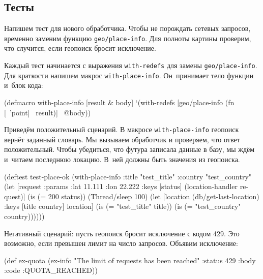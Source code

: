 \subsection{Тесты}


Напишем тест для нового обработчика. Чтобы не порождать сетевых запросов,
временно заменим функцию \verb|geo/place-info|. Для полноты картины проверим,
что случится, если геопоиск бросит исключение.

Каждый тест начинается с выражения \verb|with-redefs| для замены
\verb|geo/place-info|. Для краткости напишем макрос
\verb|with-place-info|. Он~принимает тело функции и~блок кода:

\begin{english}
  \begin{clojure}
(defmacro with-place-info
  [result & body]
  `(with-redefs [geo/place-info
                 (fn [~'point] ~result)]
     ~@body))
  \end{clojure}
\end{english}

Приведём положительный сценарий. В макросе \verb|with-place-info| геопоиск
вернёт заданный словарь. Мы вызываем обработчик и проверяем, что ответ
положительный. Чтобы убедиться, что футура записала данные в базу, мы ждём
и~читаем последнюю локацию. В~ней должны быть значения из геопоиска.

\begin{english}
  \begin{clojure}
(deftest test-place-ok
  (with-place-info
    {:title "test_title"
     :country "test_country"}
    (let [request {:params {:lat 11.111 :lon 22.222}}
          {:keys [status]} (location-handler request)]
      (is (= 200 status))
      (Thread/sleep 100)
      (let [location (db/get-last-location)
            {:keys [title country]} location]
        (is (= "test_title" title))
        (is (= "test_country" country))))))
  \end{clojure}
\end{english}


Негативный сценарий: пусть геопоиск бросит исключение с кодом 429. Это
возможно, если превышен лимит на число запросов. Объявим исключение:

\begin{english}
  \begin{clojure}
(def ex-quota
  (ex-info "The limit of requests has been reached"
           {:status 429 :body {:code :QUOTA_REACHED}}))
  \end{clojure}
\end{english}

